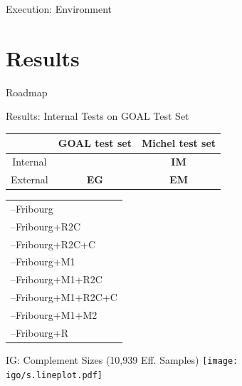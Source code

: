 \documentclass[12pt]{beamer}
\newcommand{\fat}[1]{\textbf{#1}}
\newcommand{\tocstyle}[1]{
\Large
\vspace{0.25cm}
\hspace{0.5cm}
\parbox[top][0.66\textheight][c]{0.66\textwidth}{#1}}
\newcommand{\activecell}[1]{\cellcolor{red}\color{white}{#1}}
\newcommand{\igo}{../results/figures/internal/goal}
\newcommand{\myitem}{--\hspace*{\labelsep}}
\newcommand{\igol}{
\begin{tabular}{l}
\myitem Fribourg \\
\myitem Fribourg+R2C \\
\myitem Fribourg+R2C+C \\
\myitem Fribourg+M1 \\
\myitem Fribourg+M1+R2C \\
\myitem Fribourg+M1+R2C+C \\
\myitem Fribourg+M1+M2 \\
\myitem Fribourg+R \\
\end{tabular}}
\begin{document}
\begin{frame}{Execution: Environment}
\end{frame}


\section{Results}
\begin{frame}{Roadmap}
\tocstyle{\tableofcontents[currentsection]}
\end{frame}

\begin{frame}{Results: Internal Tests on GOAL Test Set}
\begin{center}
{\renewcommand{\arraystretch}{1.25}
\begin{tabular}{c|c|c}
         & GOAL test set & Michel test set \\ \hline
Internal & \activecell{\fat{IG}}     & \fat{IM}        \\ \hline
External & \fat{EG}                  & \fat{EM}        \\
\end{tabular}}

\vspace{0.75cm}
\igol
\end{center}
\end{frame}

\begin{frame}{IG: Complement Sizes (10,939 Eff. Samples)}
\texttt{[image: \\igo/s.lineplot.pdf]}
\end{frame}
\end{document}
